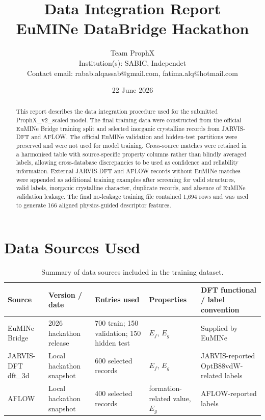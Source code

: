 \documentclass[10pt, a4paper]{article}
\title{%
  \textbf{Data Integration Report}\\[4pt]
  {\large EuMINe DataBridge Hackathon \hackathonyear}
}
\author{
  Team ProphX \\
  \small Institution(s): SABIC, Independet \\
  \small Contact email: rabab.alqassab@gmail.com, fatima.alq@hotmail.com
}
\date{22 June 2026}
\begin{document}
\maketitle
\thispagestyle{fancy}

\begin{abstract}
This report describes the data integration procedure used for the submitted ProphX\_v2\_scaled model. The final training data were constructed from the official EuMINe Bridge training split and selected inorganic crystalline records from JARVIS-DFT and AFLOW. The official EuMINe validation and hidden-test partitions were preserved and were not used for model training. Cross-source matches were retained in a harmonised table with source-specific property columns rather than blindly averaged labels, allowing cross-database discrepancies to be used as confidence and reliability information. External JARVIS-DFT and AFLOW records without EuMINe matches were appended as additional training examples after screening for valid structures, valid labels, inorganic crystalline character, duplicate records, and absence of EuMINe validation leakage. The final no-leakage training file contained 1,694 rows and was used to generate 166 aligned physics-guided descriptor features.
\end{abstract}

\tableofcontents
\vspace{1em}

\section{Data Sources Used}

\begin{table}[h!]
\centering
\caption{Summary of data sources included in the training dataset.}
\label{tab:sources}
\begin{tabular}{@{}lllll@{}}
\toprule
Source & Version / date & Entries used & Properties & DFT functional / label convention \\
\midrule
EuMINe Bridge & 2026 hackathon release & 700 train; 150 validation; 150 hidden test & $E_f$, $E_g$ & Supplied by EuMINe \\
JARVIS-DFT dft\_3d & Local hackathon snapshot & 600 selected records & $E_f$, $E_g$ & JARVIS-reported OptB88vdW-related labels \\
AFLOW & Local hackathon snapshot & 400 selected records & formation-related value, $E_g$ & AFLOW-reported labels \\
\bottomrule
\end{tabular}
\end{table}
\end{document}
